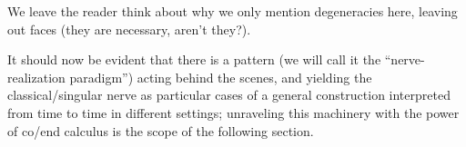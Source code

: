 We leave the reader think about why we only mention degeneracies here, leaving out faces (they are necessary, aren't they?).%

It should now be evident that there is a pattern (we will call it the  ``nerve\hyp{}realization paradigm'') acting behind the scenes, and yielding the classical/singular nerve as particular cases of a general construction interpreted from time to time in different settings; unraveling this machinery with the power of co/end calculus is the scope of the following section.
